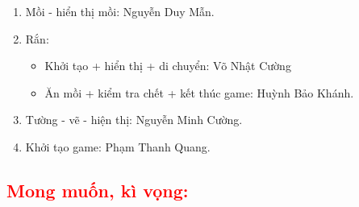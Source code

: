 \documentclass{article}
\begin{document}
\begin{enumerate}
    \item Mồi - hiển thị mồi: Nguyễn Duy Mẫn.
    \item Rắn: \par
        \begin{itemize}
            \item Khởi tạo + hiển thị + di chuyển: Võ Nhật Cường
            \item Ăn mồi + kiểm tra chết + kết thúc game: Huỳnh Bảo Khánh. 
        \end{itemize}
    \item Tường - vẽ - hiện thị: Nguyễn Minh Cường. 
    \item Khởi tạo game: Phạm Thanh Quang. 
\end{enumerate}




\textcolor{red}{\section{\Large{Mong muốn, kì vọng:}}}
\end{document}

